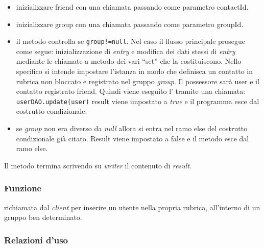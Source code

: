 \begin{description}
\begin{itemize}
		\item inizializzare friend con una chiamata  passando come parametro contactId.
		\item inizializzare group con una chiamata  passando come parametro groupId.
		\item il metodo controlla se \texttt{group!=null}. Nel caso il flusso principale prosegue come segue: inizializzazione di \textit{entry} e modifica dei dati stessi di \textit{entry} mediante le chiamate a metodo dei vari ``set'' che la costituiscono. Nello specifico si intende impostare l'istanza in modo che definisca un contatto in rubrica non bloccato e registrato nel gruppo \textit{group}. Il possessore sarà user e il contatto registrato friend. Quindi viene eseguito l' tramite una chiamata:\\
		\verb|userDAO.update(user)|
		result viene impostato a \textit{true} e il programma esce dal costrutto condizionale.
		\item se \textit{group} non era diverso da \textit{null} allora si entra nel ramo else del costrutto condizionale già citato. Result viene impostato a false e il metodo esce dal ramo else.
	\end{itemize}
	Il metodo termina scrivendo su \textit{writer} il contenuto di \textit{result}.
	
\end{description}



\subsubsection*{Funzione}
 richiamata dal \textit{client} per inserire un utente nella propria rubrica, all'interno di un gruppo ben determinato.

\subsubsection*{Relazioni d'uso}

